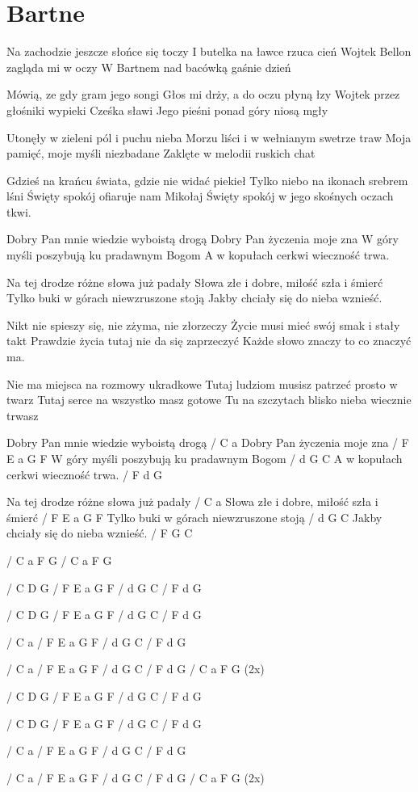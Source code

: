 \section{Bartne}
\begin{text}
[Recytacja]
	Na zachodzie jeszcze słońce się toczy
	I butelka na ławce rzuca cień
	Wojtek Bellon zagląda mi w oczy
	W Bartnem nad bacówką gaśnie dzień

	Mówią, ze gdy gram jego songi
	Głos mi drży, a do oczu płyną łzy
	Wojtek przez głośniki wypieki Cześka sławi
	Jego pieśni ponad góry niosą mgły

Utonęły w zieleni pól i puchu nieba
Morzu liści i w wełnianym swetrze traw
Moja pamięć, moje myśli niezbadane
Zaklęte w melodii ruskich chat

Gdzieś na krańcu świata, gdzie nie widać piekieł
Tylko niebo na ikonach srebrem lśni
Święty spokój ofiaruje nam Mikołaj
Święty spokój w jego skośnych oczach tkwi.

	Dobry Pan mnie wiedzie wyboistą drogą
	Dobry Pan życzenia moje zna
	W góry myśli poszybują ku pradawnym Bogom
	A w kopułach cerkwi wieczność trwa.

	Na tej drodze różne słowa już padały
	Słowa złe i dobre, miłość szła i śmierć
	Tylko buki w górach niewzruszone stoją
	Jakby chciały się do nieba wznieść.


Nikt nie spieszy się, nie zżyma, nie złorzeczy
Życie musi mieć swój smak i stały takt
Prawdzie życia tutaj nie da się zaprzeczyć
Każde słowo znaczy to co znaczyć ma.

Nie ma miejsca na rozmowy ukradkowe
Tutaj ludziom musisz patrzeć prosto w twarz
Tutaj serce na wszystko masz gotowe
Tu na szczytach blisko nieba wiecznie trwasz

	Dobry Pan mnie wiedzie wyboistą drogą / C a
	Dobry Pan życzenia moje zna / F E a G F
	W góry myśli poszybują 
	ku pradawnym Bogom / d G C
	A w kopułach cerkwi wieczność trwa. / F d G

	Na tej drodze różne słowa już padały / C a
	Słowa złe i dobre, miłość szła i śmierć / F E a G F
	Tylko buki w górach niewzruszone stoją / d G C
	Jakby chciały się do nieba wznieść. / F G C

\end{text}
\begin{chord}
/ C a F G
/ C a F G

 / C D G
 / F E a G F
 / d G C
 / F d G

 / C D G
 / F E a G F
 / d G C
 / F d G

 / C a
 / F E a G F
 / d G C
 / F d G  

 / C a
 / F E a G F
 / d G C
 / F d G  
/ C a F G (2x)

 / C D G
 / F E a G F
 / d G C
 / F d G

 / C D G
 / F E a G F
 / d G C
 / F d G

 / C a
 / F E a G F
 / d G C
 / F d G  

 / C a
 / F E a G F
 / d G C
 / F d G  
/ C a F G (2x)
  \end{chord}
